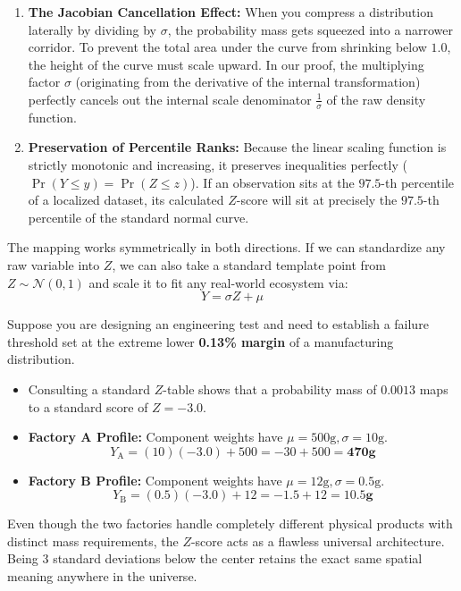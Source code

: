 \documentclass{article}
\begin{document}
\begin{enumerate}
    \item \textbf{The Jacobian Cancellation Effect:} When you compress a distribution laterally by dividing by $\sigma$, the probability mass gets squeezed into a narrower corridor. To prevent the total area under the curve from shrinking below $1.0$, the height of the curve must scale upward. In our proof, the multiplying factor $\sigma$ (originating from the derivative of the internal transformation) perfectly cancels out the internal scale denominator $\frac{1}{\sigma}$ of the raw density function.
    \item \textbf{Preservation of Percentile Ranks:} Because the linear scaling function is strictly monotonic and increasing, it preserves inequalities perfectly ($\Pr(Y \le y) = \Pr(Z \le z)$). If an observation sits at the $97.5$-th percentile of a localized dataset, its calculated $Z$-score will sit at precisely the $97.5$-th percentile of the standard normal curve.
\end{enumerate}

\begin{tcolorbox}[colback=blue!5!white, colframe=blue!60!black, title=Numerical Mechanics: Symmetrical Inverse Mapping]
The mapping works symmetrically in both directions. If we can standardize any raw variable into $Z$, we can also take a standard template point from $Z \sim \mathcal{N}(0,1)$ and scale it to fit any real-world ecosystem via:
\begin{equation*}
    Y = \sigma Z + \mu
\end{equation*}

Suppose you are designing an engineering test and need to establish a failure threshold set at the extreme lower \textbf{0.13\% margin} of a manufacturing distribution. 
\begin{itemize}
    \item Consulting a standard $Z$-table shows that a probability mass of $0.0013$ maps to a standard score of $Z = -3.0$.
    \item \textbf{Factory A Profile:} Component weights have $\mu = 500\text{g}, \sigma = 10\text{g}$.
    \begin{equation*}
        Y_{\text{A}} = (10)(-3.0) + 500 = -30 + 500 = \mathbf{470\text{g}}
    \end{equation*}
    \item \textbf{Factory B Profile:} Component weights have $\mu = 12\text{g}, \sigma = 0.5\text{g}$.
    \begin{equation*}
        Y_{\text{B}} = (0.5)(-3.0) + 12 = -1.5 + 12 = \mathbf{10.5\text{g}}
    \end{equation*}
\end{itemize}
Even though the two factories handle completely different physical products with distinct mass requirements, the $Z$-score acts as a flawless universal architecture. Being $3$ standard deviations below the center retains the exact same spatial meaning anywhere in the universe.
\end{tcolorbox}
\end{document}
